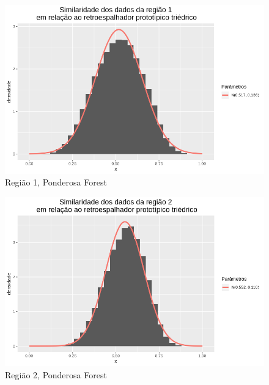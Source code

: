 \documentclass[12pt]{article}
\begin{document}
\begin{figure}[!h]
    \centering
    \includegraphics[width = \linewidth]{../../Images/Report_18_12_20/ponder_tri_region1.png}
    \caption{Região 1, Ponderosa Forest}
    \label{fig:pond_tri_r1}
\end{figure}

\begin{figure}[!h]
    \centering
    \includegraphics[width = \linewidth]{../../Images/Report_18_12_20/ponder_tri_region2.png}
    \caption{Região 2, Ponderosa Forest}
    \label{fig:pond_tri_r2}
\end{figure}
\end{document}
